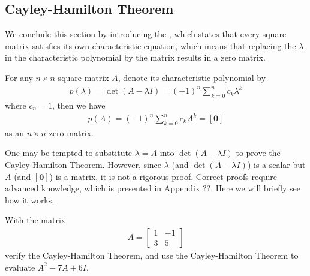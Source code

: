 \subsection{Cayley-Hamilton Theorem}
We conclude this section by introducing the , which states that every square matrix satisfies its own characteristic equation, which means that replacing the $\lambda$ in the characteristic polynomial by the matrix results in a zero matrix.
\begin{thm}
For any $n \times n$ square matrix $A$, denote its characteristic polynomial by
\begin{align}
p(\lambda) = \det(A-\lambda I) = (-1)^n \sum_{k=0}^{n} c_k \lambda^k
\end{align}
where $c_n = 1$, then we have
\begin{align}
p(A) = (-1)^n \sum_{k=0}^{n} c_k A^k = [\textbf{0}]
\end{align}
as an $n \times n$ zero matrix.
\end{thm}
One may be tempted to substitute $\lambda = A$ into $\det(A-\lambda I)$ to prove the Cayley-Hamilton Theorem. However, since $\lambda$ (and $\det(A-\lambda I)$) is a scalar but $A$ (and $[\textbf{0}]$) is a matrix, it is not a rigorous proof. Correct proofs require advanced knowledge, which is presented in Appendix ??. Here we will briefly see how it works.
\begin{exmp}
With the matrix
\begin{align*}
A = 
\begin{bmatrix}
1 & -1 \\
3 & 5
\end{bmatrix}
\end{align*}
verify the Cayley-Hamilton Theorem, and use the Cayley-Hamilton Theorem to evaluate $A^2 - 7A + 6I$.
\end{exmp}
